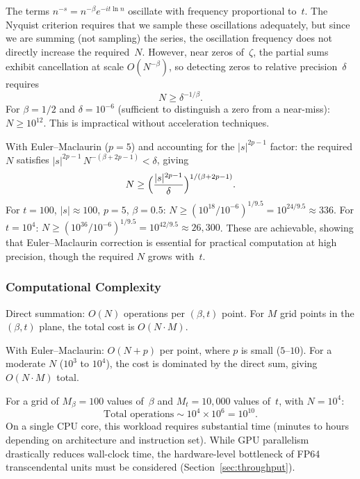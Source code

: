 The terms $n^{-s} = n^{-\beta}e^{-it\ln n}$ oscillate with frequency proportional
to~$t$. The Nyquist criterion requires that we sample these oscillations adequately, but
since we are summing (not sampling) the series, the oscillation frequency does not
directly increase the required~$N$. However, near zeros of~$\zeta$, the partial sums
exhibit cancellation at scale $O(N^{-\beta})$, so detecting zeros to relative
precision~$\delta$ requires
\begin{equation}\label{eq:required-N}
  N \ge \delta^{-1/\beta}.
\end{equation}
For $\beta = 1/2$ and $\delta = 10^{-6}$ (sufficient to distinguish a zero from a
near-miss): $N \ge 10^{12}$. This is impractical without acceleration techniques.

With Euler--Maclaurin ($p = 5$) and accounting for the $|s|^{2p-1}$ factor: the required
$N$ satisfies $|s|^{2p-1}\,N^{-(\beta+2p-1)} < \delta$, giving
\begin{equation}\label{eq:required-N-em}
  N \ge \Bigl(\frac{|s|^{2p-1}}{\delta}\Bigr)^{1/(\beta+2p-1)}.
\end{equation}
For $t = 100$, $|s| \approx 100$, $p = 5$, $\beta = 0.5$:
$N \ge (10^{18}/10^{-6})^{1/9.5} = 10^{24/9.5} \approx 336$. For $t = 10^4$:
$N \ge (10^{36}/10^{-6})^{1/9.5} = 10^{42/9.5} \approx 26{,}300$. These are achievable,
showing that Euler--Maclaurin correction is essential for practical computation at high
precision, though the required $N$ grows with~$t$.

\subsubsection{Computational Complexity}
\label{sec:complexity}

Direct summation: $O(N)$ operations per $(\beta, t)$ point. For $M$ grid points in the
$(\beta, t)$ plane, the total cost is $O(N \cdot M)$.

With Euler--Maclaurin: $O(N + p)$ per point, where $p$ is small ($5$--$10$). For a
moderate $N$ ($10^3$ to $10^4$), the cost is dominated by the direct sum, giving
$O(N \cdot M)$ total.

For a grid of $M_\beta = 100$ values of~$\beta$ and $M_t = 10{,}000$ values of~$t$,
with $N = 10^4$:
\begin{equation}\label{eq:total-ops}
  \text{Total operations} \sim 10^4 \times 10^6 = 10^{10}.
\end{equation}
On a single CPU core, this workload requires substantial time (minutes to hours 
depending on architecture and instruction set). While GPU parallelism 
drastically reduces wall-clock time, the hardware-level bottleneck of 
FP64 transcendental units must be considered (Section~\ref{sec:throughput}).


